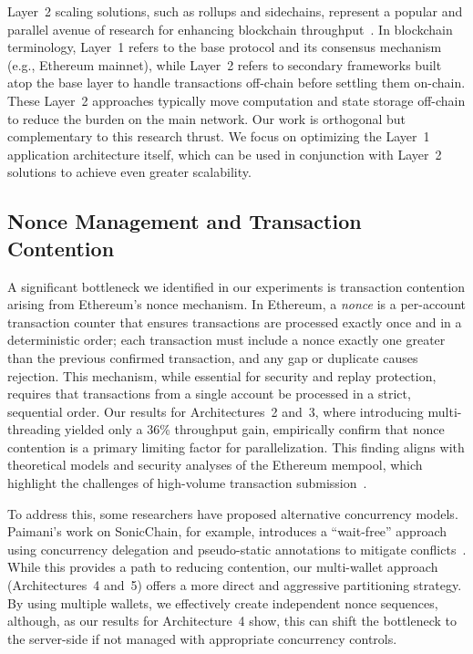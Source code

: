 Layer~2 scaling solutions, such as rollups and sidechains, represent a popular and parallel avenue of research for enhancing blockchain throughput~\cite{song2024layer}. In blockchain terminology, Layer~1 refers to the base protocol and its consensus mechanism (e.g., Ethereum mainnet), while Layer~2 refers to secondary frameworks built atop the base layer to handle transactions off-chain before settling them on-chain. These Layer~2 approaches typically move computation and state storage off-chain to reduce the burden on the main network. Our work is orthogonal but complementary to this research thrust. We focus on optimizing the Layer~1 application architecture itself, which can be used in conjunction with Layer~2 solutions to achieve even greater scalability.

\subsection{Nonce Management and Transaction Contention}

A significant bottleneck we identified in our experiments is transaction contention arising from Ethereum's nonce mechanism. In Ethereum, a \textit{nonce} is a per-account transaction counter that ensures transactions are processed exactly once and in a deterministic order; each transaction must include a nonce exactly one greater than the previous confirmed transaction, and any gap or duplicate causes rejection. This mechanism, while essential for security and replay protection, requires that transactions from a single account be processed in a strict, sequential order. Our results for Architectures~2 and~3, where introducing multi-threading yielded only a 36\% throughput gain, empirically confirm that nonce contention is a primary limiting factor for parallelization. This finding aligns with theoretical models and security analyses of the Ethereum mempool, which highlight the challenges of high-volume transaction submission~\cite{wang2024mempool}.

To address this, some researchers have proposed alternative concurrency models. Paimani's work on SonicChain, for example, introduces a ``wait-free'' approach using concurrency delegation and pseudo-static annotations to mitigate conflicts~\cite{paimani2021sonicchain}. While this provides a path to reducing contention, our multi-wallet approach (Architectures~4 and~5) offers a more direct and aggressive partitioning strategy. By using multiple wallets, we effectively create independent nonce sequences, although, as our results for Architecture~4 show, this can shift the bottleneck to the server-side if not managed with appropriate concurrency controls.

